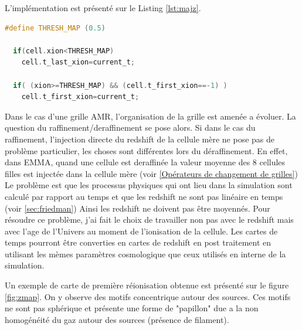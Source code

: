 L'implémentation est présenté sur le Listing \ref{lst:majz}.

\begin{lstlisting}[float=bth,language=c,frame=tb,caption={Mise a jour du redshift de reionisation},label=lst:majz]
  #define THRESH_MAP (0.5)

  if(cell.xion<THRESH_MAP)
    cell.t_last_xion=current_t;

  if( (xion>=THRESH_MAP) && (cell.t_first_xion==-1) )
    cell.t_first_xion=current_t;
\end{lstlisting}


Dans le cas d'une grille \ac{AMR}, l'organisation de la grille est amenée a évoluer.
La question du raffinement/deraffinement se pose alors.
Si dans le cas du raffinement, l'injection directe du redshift de la cellule mère ne pose pas de problème particulier, les choses sont différentes lors du déraffinement.
En effet, dans EMMA, quand une cellule est deraffinée la valeur moyenne des 8 cellules filles est injectée dans la cellule mère (voir \ref{Opérateurs de changement de grilles})
Le problème est que les processus physiques qui ont lieu dans la simulation sont calculé par rapport au temps et que les redshift ne sont pas linéaire en temps (voir \ref{sec:friedman})
Ainsi les redshift ne doivent pas être moyennés.
Pour résoudre ce problème, j'ai fait le choix de travailler non pas avec le redshift mais avec l'age de l'Univers au moment de l'ionisation de la cellule.
Les cartes de temps pourront être converties en cartes de redshift en post traitement en utilisant les mèmes paramètres cosmologique que ceux utilisés en interne de la simulation.

Un exemple de carte de première réionisation obtenue est présenté sur le figure \ref{fig:zmap}.
On y observe des motifs concentrique autour des sources.
Ces motifs ne sont pas sphérique et présente une forme de "papillon" due a la non homogénéité du gaz autour des sources (présence de filament).

